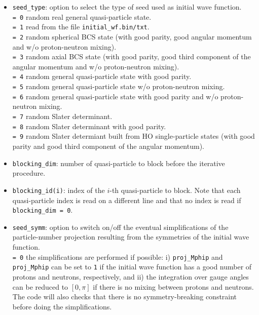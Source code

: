 \documentclass[a4paper,11pt]{article}
\newcommand{\ttt}[1]{\texttt{#1}}
\begin{document}
\begin{itemize}
\item \ttt{seed\_type}: option to select the type of seed used as initial wave function. \\[0.05cm]
 \ttt{= 0\:} random real general quasi-particle state. \\[0.05cm]
 \ttt{= 1\:} read from the file \ttt{initial\_wf.bin/txt}. \\[0.05cm]
 \ttt{= 2\:} random spherical BCS state (with good parity, good angular momentum and w/o proton-neutron mixing). \\[0.05cm]
 \ttt{= 3\:} random axial BCS state (with good parity, good third component of the angular momentum and w/o proton-neutron mixing). \\[0.05cm]
 \ttt{= 4\:} random general quasi-particle state with good parity. \\[0.05cm]
 \ttt{= 5\:} random general quasi-particle state w/o proton-neutron mixing. \\[0.05cm]
 \ttt{= 6\:} random general quasi-particle state with good parity and w/o proton-neutron mixing. \\[0.05cm]
 \ttt{= 7\:} random Slater determinant. \\[0.05cm]
 \ttt{= 8\:} random Slater determinant with good parity. \\[0.05cm]
 \ttt{= 9\:} random Slater determiant built from HO single-particle states (with good parity and good third component of the angular momentum).
\item \ttt{blocking\_dim}: number of quasi-particle to block before the iterative procedure.
\item \ttt{blocking\_id(i)}: index of the $i$-th quasi-particle to block. Note that each quasi-particle index is read on a different line and
 that no index is read if \ttt{blocking\_dim = 0}.
\item \ttt{seed\_symm}: option to switch on/off the eventual simplifications of the particle-number projection resulting from the symmetries of the 
 initial wave function. \\[0.05cm]
 \ttt{= 0\:} the simplifications are performed if possible: i) \ttt{proj\_Mphip} and \ttt{proj\_Mphip} can be set to \ttt{1} if the initial wave function
 has a good number of protons and neutrons, respectively, and ii) the integration over gauge angles can be reduced to $[0,\pi]$ if there is no
 mixing between protons and neutrons. The code will also checks that there is no symmetry-breaking constraint before doing the 
 simplifications. \\[0.05cm]

\end{itemize}
\end{document}
